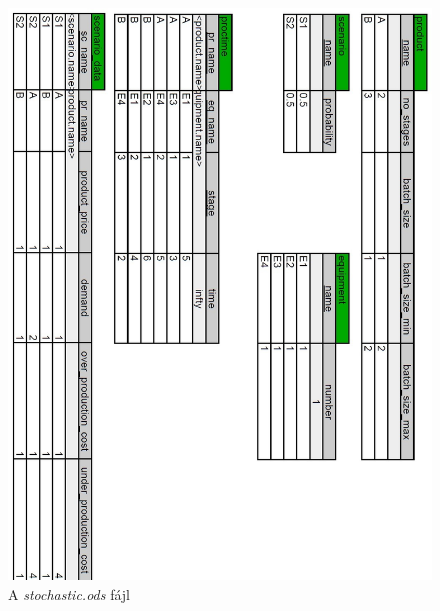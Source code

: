 \begin{figure}[H]
\begin{center}
\includegraphics[scale=0.5]{stochasticOds}
\caption{A \textit{stochastic.ods} fájl}
\label{stochastic_ods}
\end{center}
\end{figure}
